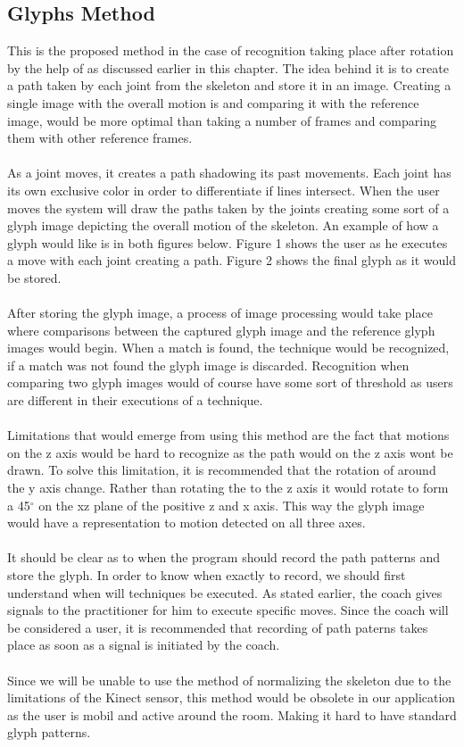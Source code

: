 \subsection{Glyphs Method}
This is the proposed method in the case of recognition taking place after rotation by the help of \N as discussed earlier in this chapter. The idea behind it is to create a path taken by each joint from the skeleton and store it in an image. Creating a single image with the overall motion is and comparing it with the reference image, would be more optimal than taking a number of frames and comparing them with other reference frames.
\\
\\
As a joint moves, it creates a path shadowing its past movements. Each joint has its own exclusive color in order to differentiate if lines intersect. When the user moves the system will draw the paths taken by the joints creating some sort of a glyph image depicting the overall motion of the skeleton. An example of how a glyph would like is in both figures below. Figure 1 shows the user as he executes a move with each joint creating a path. Figure 2 shows the final glyph as it would be stored.
\\
\\
After storing the glyph image, a process of image processing would take place where comparisons between the captured glyph image and the reference glyph images would begin. When a match is found, the technique would be recognized, if a match was not found the glyph image is discarded. Recognition when comparing two glyph images would of course have some sort of threshold as users are different in their executions of a technique.
\\
\\
Limitations that would emerge from using this method are the fact that motions on the z axis would be hard to recognize as the path would on the z axis wont be drawn. To solve this limitation, it is recommended that the rotation of \N around the y axis change. Rather than rotating the \N to the z axis it would rotate to form a 45$^\circ$ on the xz plane of the positive z and x axis. This way the glyph image would have a representation to motion detected on all three axes.
\\
\\
It should be clear as to when the program should record the path patterns and store the glyph. In order to know when exactly to record, we should first understand when will techniques be executed. As stated earlier, the coach gives signals to the practitioner for him to execute specific moves. Since the coach will be considered a user, it is recommended that recording of path paterns takes place as soon as a signal is initiated by the coach.
\\
\\
Since we will be unable to use the method of normalizing the skeleton due to the limitations of the Kinect sensor, this method would be obsolete in our application as the user is mobil and active around the room. Making it hard to have standard glyph patterns.

